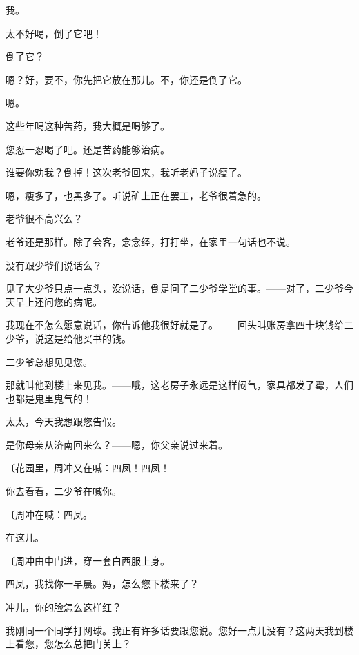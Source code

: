 我。

太不好喝，倒了它吧！

倒了它？

嗯？好，要不，你先把它放在那儿。不，你还是倒了它。

嗯。

这些年喝这种苦药，我大概是喝够了。

您忍一忍喝了吧。还是苦药能够治病。

谁要你劝我？倒掉！这次老爷回来，我听老妈子说瘦了。

嗯，瘦多了，也黑多了。听说矿上正在罢工，老爷很着急的。

老爷很不高兴么？

老爷还是那样。除了会客，念念经，打打坐，在家里一句话也不说。

没有跟少爷们说话么？

见了大少爷只点一点头，没说话，倒是问了二少爷学堂的事。——对了，二少爷今天早上还问您的病呢。

我现在不怎么愿意说话，你告诉他我很好就是了。——回头叫账房拿四十块钱给二少爷，说这是给他买书的钱。

二少爷总想见见您。

那就叫他到楼上来见我。——哦，这老房子永远是这样闷气，家具都发了霉，人们也都是鬼里鬼气的！

太太，今天我想跟您告假。

是你母亲从济南回来么？——嗯，你父亲说过来着。

{\fangsong〔花园里，周冲又在喊：四凤！四凤！}

你去看看，二少爷在喊你。

{\fangsong〔周冲在喊：四凤。}

在这儿。

{\fangsong〔周冲由中门进，穿一套白西服上身。}

四凤，我找你一早晨。妈，怎么您下楼来了？

冲儿，你的脸怎么这样红？

我刚同一个同学打网球。我正有许多话要跟您说。您好一点儿没有？这两天我到楼上看您，您怎么总把门关上？

